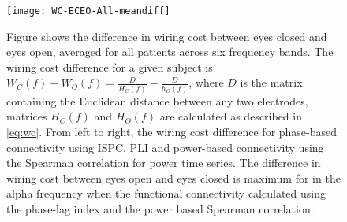 \documentclass[11pt, onecolumn]{article}
\begin{document}
\begin{figure}[h]
        \centering
        \texttt{[image: WC-ECEO-All-meandiff]}
        \caption{Figure shows the difference in wiring cost between eyes closed and eyes open, averaged for all patients across six frequency bands. The wiring cost difference for a given subject is $W_C(f) - W_O(f) = \frac{D}{H_{C}(f)} - \frac{D}{h_{O}(f)}$, where $D$ is the matrix containing the Euclidean distance between any two electrodes, matrices $H_{C}(f)$ and $H_{O}(f)$ are calculated as described in \ref{eq:wc}. From left to right, the wiring cost difference for phase-based connectivity using ISPC, PLI and power-based connectivity using the Spearman correlation for power time series. The difference in wiring cost between eyes open and eyes closed is maximum for in the alpha frequency when the functional connectivity calculated using the phase-lag index and the power based Spearman correlation.}
        \label{fig:figi-1}
\end{figure}
\end{document}
